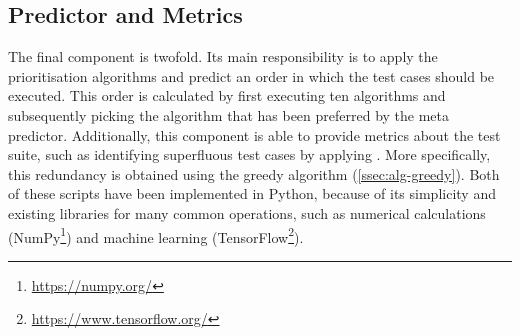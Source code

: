 \subsection{Predictor and Metrics}\label{ssec:velocity-predictor}
The final component is twofold. Its main responsibility is to apply the prioritisation algorithms and predict an order in which the test cases should be executed. This order is calculated by first executing ten algorithms and subsequently picking the algorithm that has been preferred by the meta predictor. Additionally, this component is able to provide metrics about the test suite, such as identifying superfluous test cases by applying \tsm{}. More specifically, this redundancy is obtained using the greedy algorithm (\autoref{ssec:alg-greedy}). Both of these scripts have been implemented in Python, because of its simplicity and existing libraries for many common operations, such as numerical calculations (NumPy\footnote{\url{https://numpy.org/}}) and machine learning (TensorFlow\footnote{\url{https://www.tensorflow.org/}}).